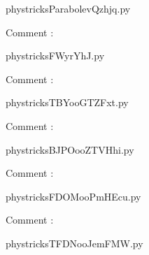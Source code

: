     \newcommand{\CaptionFigParabolevQzhjq}{<+Type your caption here+>}
    \begin{center}
        
    \end{center}
    phystricksParabolevQzhjq.py

    Comment : 

    \clearpage
    


    \newcommand{\CaptionFigFWyrYhJ}{<+Type your caption here+>}
    \begin{center}
        
    \end{center}
    phystricksFWyrYhJ.py

    Comment : 

    \clearpage
    


    \newcommand{\CaptionFigTBYooGTZFxt}{<+Type your caption here+>}
    \begin{center}
        
    \end{center}
    phystricksTBYooGTZFxt.py

    Comment : 

    \clearpage
    


    \newcommand{\CaptionFigBJPOooZTVHhi}{<+Type your caption here+>}
    \begin{center}
        
    \end{center}
    phystricksBJPOooZTVHhi.py

    Comment : 

    \clearpage
    


    \newcommand{\CaptionFigFDOMooPmHEcu}{<+Type your caption here+>}
    \begin{center}
        
    \end{center}
    phystricksFDOMooPmHEcu.py

    Comment : 

    \clearpage
    


    \newcommand{\CaptionFigTFDNooJemFMW}{<+Type your caption here+>}
    \begin{center}
        
    \end{center}
    phystricksTFDNooJemFMW.py

